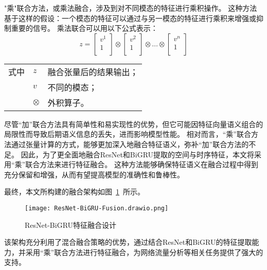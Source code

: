 "乘"联合方法，或乘法融合，涉及到对不同模态的特征进行乘积操作。
这种方法基于这样的假设：一个模态的特征可以通过与另一模态的特征进行乘积来增强或抑制重要的信号。
乘法联合可以用以下公式表示：
\begin{equation}
	z = \begin{bmatrix}v^1 \\1\\\end{bmatrix} \otimes \begin{bmatrix}v^2 \\1\\\end{bmatrix} \otimes \dots \otimes \begin{bmatrix}v^n \\1\\\end{bmatrix}
\end{equation}
\begin{flushleft}
	\renewcommand\arraystretch{1.25}
	\begin{tabularx}{\textwidth}{@{}>{\normalsize\rm}l@{\quad}>{\normalsize\rm}l@{——}>{\normalsize\rm}X@{}}
		式中 & $z$       & 融合张量后的结果输出； \\
		     & $v$       & 不同的模态；           \\
		     & $\otimes$ & 外积算子。             \\
	\end{tabularx}\vspace{.5ex}
\end{flushleft}



尽管“加”联合方法具有简单性和易实现性的优势，但它可能因特征向量语义组合的局限性而导致后期语义信息的丢失，进而影响模型性能。
相对而言，“乘”联合方法通过张量计算的方式，能够更加深入地融合特征语义，弥补“加”联合方法的不足\cite{hejunandzhangcaiqing}。
因此，为了更全面地融合ResNet和BiGRU提取的空间与时序特征，本文将采用“乘”联合方法来进行特征融合。
这种方法能够确保特征语义在融合过程中得到充分保留和增强，从而有望提高模型的准确性和鲁棒性。\par

最终，本文所构建的融合架构如图~\ref{fig:ResNet-BiGRU-Fusion}~所示。
\begin{figure}[htbp]
	\centering
	\texttt{[image: ResNet-BiGRU-Fusion.drawio.png]}
	\caption{ResNet-BiGRU特征融合设计}
	\label{fig:ResNet-BiGRU-Fusion}
\end{figure}
该架构充分利用了混合融合策略的优势，通过结合ResNet和BiGRU的特征提取能力，并采用“乘”联合方法进行特征融合，为网络流量分析等相关任务提供了强大的支持。

